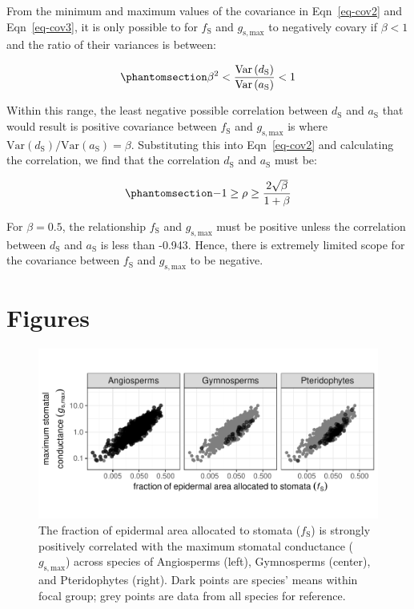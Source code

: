 \documentclass[
  letterpaper,
  DIV=11,
  numbers=noendperiod]{scrartcl}
\begin{document}
From the minimum and maximum values of the covariance in
Eqn~\ref{eq-cov2} and Eqn~\ref{eq-cov3}, it is only possible to for
\(f_\text{S}\) and \(g_\mathrm{s,max}\) to negatively covary if
\(\beta < 1\) and the ratio of their variances is between:

\begin{equation}\phantomsection\label{eq-ratio1}{ \beta ^ 2 < \frac{\text{Var} \left( d_\text{S} \right)}{\text{Var} \left( a_\text{S} \right)} < 1}\end{equation}

Within this range, the least negative possible correlation between
\(d_\text{S}\) and \(a_\text{S}\) that would result is positive
covariance between \(f_\text{S}\) and \(g_\mathrm{s,max}\) is where
\(\text{Var} \left( d_\text{S} \right) / \text{Var} \left( a_\text{S} \right) = \beta\).
Substituting this into Eqn~\ref{eq-cov2} and calculating the
correlation, we find that the correlation \(d_\text{S}\) and
\(a_\text{S}\) must be:

\begin{equation}\phantomsection\label{eq-rho}{ -1 \ge \rho \ge \frac{2 \sqrt{\beta}}{1 + \beta}}\end{equation}

For \(\beta = 0.5\), the relationship \(f_\text{S}\) and
\(g_\mathrm{s,max}\) must be positive unless the correlation between
\(d_\text{S}\) and \(a_\text{S}\) is less than -0.943. Hence, there is
extremely limited scope for the covariance between \(f_\text{S}\) and
\(g_\mathrm{s,max}\) to be negative.

\section{Figures}\label{sec-figures}

\begin{figure}
\caption{The fraction of epidermal area allocated to stomata ($f_\mathrm{S}$) is strongly positively correlated with the maximum stomatal conductance ($g_\mathrm{s,max}$) across species of Angiosperms (left), Gymnosperms (center), and Pteridophytes (right). Dark points are species' means within focal group; grey points are data from all species for reference.}
\includegraphics{figures/fig-gmax-fs.pdf}
\end{figure}
\end{document}
